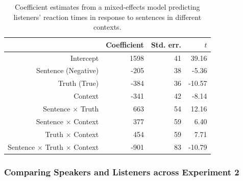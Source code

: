 \documentclass[man, floatsintext, noapacite]{apa6}
\begin{document}
\begin{table}
\caption{\label{tab:exp2_listenermodel} Coefficient estimates from a mixed-effects model predicting listeners' reaction times in response to sentences in different contexts.}
\begin{center}
\begin{tabular}{rrrr}
  \hline
 & Coefficient & Std. err. & $t$ \\ 
  \hline
Intercept & 1598 & 41 & 39.16 \\ 
  Sentence (Negative) & -205 & 38 & -5.36  \\ 
  Truth (True) & -384 & 36 & -10.57 \\
  Context & -341 & 42 & -8.14 \\ 
  Sentence $\times$ Truth & 663 & 54 & 12.16 \\
  Sentence $\times$ Context & 377 & 59 & 6.40 \\
  Truth $\times$ Context & 454 & 59 & 7.71 \\
  Sentence $\times$ Truth $\times$ Context & -901 & 83 & -10.79 \\
   \hline
\end{tabular}
\end{center}
\end{table}


\subsubsection{Comparing Speakers and Listeners across Experiment 2}
\end{document}
